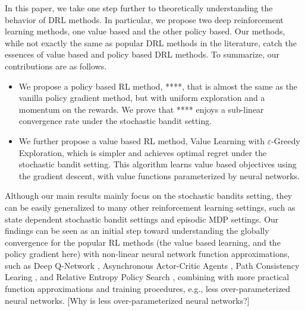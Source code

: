 In this paper, we take one step further to theoretically understanding the behavior of DRL methods. In particular, we propose two deep reinforcement learning methods, one value based and the other policy based. Our methods, while not exactly the same as popular DRL methods in the literature, catch the essences of value based and policy based DRL methods. To summarize, our contributions are as follows.
\begin{itemize}
	\item We propose a policy based RL method, ****, that is almost the same as the vanilla policy gradient method, but with uniform exploration and a momentum on the rewards. We prove that **** enjoys a sub-linear convergence rate under the stochastic bandit setting.
	\item We further propose a value based RL method, Value Learning with $\varepsilon$-Greedy Exploration, which is simpler and achieves optimal regret under the stochastic bandit setting. This algorithm learns value based objectives using the gradient descent, with value functions parameterized by neural networks. 
\end{itemize}

Although our main results mainly focus on the stochastic bandits setting, they can be easily generalized to many other reinforcement learning settings, such as state dependent stochastic bandit settings and episodic MDP settings. Our findings can be seen as an initial step toward understanding the globally convergence for the popular RL methods (the value based learning, and the policy gradient here) with non-linear neural network function approximations, such as Deep Q-Network \cite{mnih2015human}, Asynchronous Actor-Critic Agents \citep{mnih2016asynchronous}, Path Consistency Learing \citep{nachum2017bridging}, and Relative Entropy Policy Search \citep{peters2010relative}, combining with more practical function approximations and training procedures, e.g., less over-parameterized neural networks. [Why is less over-parameterized neural networks?]


